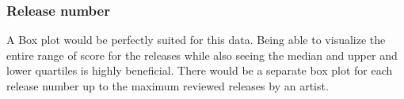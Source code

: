 \documentclass{article}
\begin{document}
\subsubsection{Release number}\label{release-number-1}

A Box plot would be perfectly suited for this data. Being able to
visualize the entire range of score for the releases while also seeing
the median and upper and lower quartiles is highly beneficial. There
would be a separate box plot for each release number up to the maximum
reviewed releases by an artist.



\end{document}
